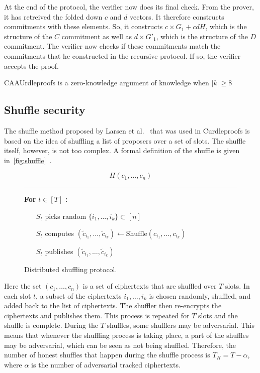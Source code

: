 At the end of the protocol, the verifier now does its final check.
From the prover, it has retreived the folded down $c$ and $d$ vectors.
It therefore constructs commitments with these elements.
So, it constructs $c\times G_1+cdH$, which is the structure of the $C$ commitment as well as $d\times G'_1$, which is the structure of the $D$ commitment.
The verifier now checks if these commitments match the commitments that he constructed in the recursive protocol.
If so, the verifier accepts the proof.

\begin{theorem}
    CAAUrdleproofs is a zero-knowledge argument of knowledge when $\left|k\right|\geq8$
\end{theorem}


\subsection{Shuffle security}\label{subsec:approach-shuffle-security}
The shuffle method proposed by Larsen et al.~\cite{cryptoeprint:2022/560} that was used in Curdleproofs is based on the idea of shuffling a list of proposers over a set of slots.
The shuffle itself, however, is not too complex.
A formal definition of the shuffle is given in~\autoref{fig:shuffle}~\cite{cryptoeprint:2022/560}.

\begin{figure}[ht]
\begin{framed}
    \[
        \Pi(c_1, \ldots, c_n)
    \]
    \rule{\linewidth}{0.4pt}

    \noindent
    \textbf{For} $t \in [T]$ \textbf{:}
    \begin{itemize}
        \item[$S_t$] picks random $\{i_1, \ldots, i_k\} \subset [n]$
        \item[$S_t$] computes $(\tilde{c}_{i_1}, \ldots, \tilde{c}_{i_k}) \leftarrow \text{Shuffle}(c_{i_1}, \ldots, c_{i_k})$
        \item[$S_t$] publishes $(\tilde{c}_{i_1}, \ldots, \tilde{c}_{i_k})$
    \end{itemize}
\end{framed}
\caption{Distributed shuffling protocol.}
\label{fig:shuffle}
\end{figure}

Here the set $(c_1, \ldots, c_n)$ is a set of ciphertexts that are shuffled over $T$ slots.
In each slot $t$, a subset of the ciphertexts ${i_1, \ldots, i_k}$ is chosen randomly, shuffled, and added back to the list of ciphertexts.
The shuffler then re-encrypts the ciphertexts and publishes them.
This process is repeated for $T$ slots and the shuffle is complete.
During the $T$ shuffles, some shufflers may be adversarial.
This means that whenever the shuffling process is taking place, a part of the shuffles may be adversarial, which can be seen as not being shuffled.
Therefore, the number of honest shuffles that happen during the shuffle process is $T_H = T - \alpha$, where $\alpha$ is the number of adversarial tracked ciphertexts.

